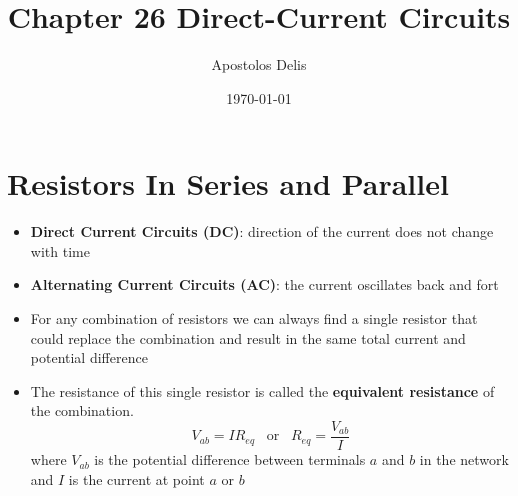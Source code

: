 \documentclass[11pt, a4paper]{article}
\begin{document}
\title{Chapter 26 Direct-Current Circuits}
\author{Apostolos Delis}
\date{\today}
\maketitle

\tableofcontents
\section[26.1 Resistors In Series and Parallel]{Resistors In Series and Parallel}
\begin{itemize}
    \item \textbf{Direct Current Circuits (DC)}: direction of the current does not
        change with time
    \item \textbf{Alternating Current Circuits (AC)}: the current oscillates back and fort
    \item For any combination of resistors we can always find a single resistor that
        could replace the combination and result in the same total current and potential
        difference
    \item The resistance of this single resistor is called the \textbf{equivalent
            resistance} of the combination.
        \begin{equation}
            V_{ab} = IR_{eq} \; \; \; \text{or} \; \; \; R_{eq} = \frac{V_{ab}}{I}
        \end{equation}
        where $V_{ab}$ is the potential difference between terminals $a$ and $b$ in the
        network and $I$ is the current at point $a$ or $b$
\end{itemize}
\end{document}
